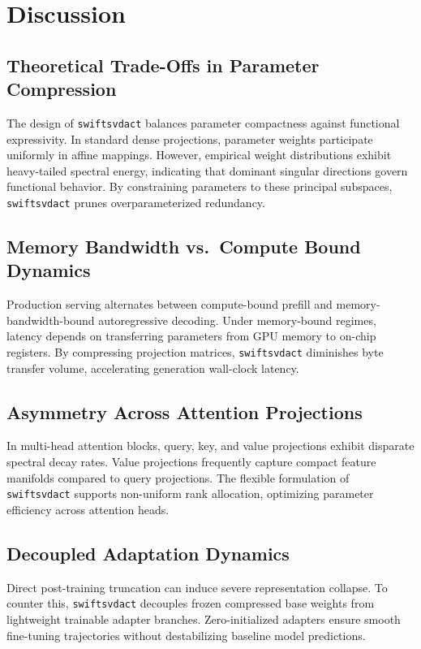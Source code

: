 \section{Discussion}

\subsection{Theoretical Trade-Offs in Parameter Compression}
The design of \texttt{swiftsvdact} balances parameter compactness against functional expressivity. In standard dense projections, parameter weights participate uniformly in affine mappings. However, empirical weight distributions exhibit heavy-tailed spectral energy, indicating that dominant singular directions govern functional behavior. By constraining parameters to these principal subspaces, \texttt{swiftsvdact} prunes overparameterized redundancy.

\subsection{Memory Bandwidth vs.\ Compute Bound Dynamics}
Production serving alternates between compute-bound prefill and memory-bandwidth-bound autoregressive decoding. Under memory-bound regimes, latency depends on transferring parameters from GPU memory to on-chip registers. By compressing projection matrices, \texttt{swiftsvdact} diminishes byte transfer volume, accelerating generation wall-clock latency.

\subsection{Asymmetry Across Attention Projections}
In multi-head attention blocks, query, key, and value projections exhibit disparate spectral decay rates. Value projections frequently capture compact feature manifolds compared to query projections. The flexible formulation of \texttt{swiftsvdact} supports non-uniform rank allocation, optimizing parameter efficiency across attention heads.

\subsection{Decoupled Adaptation Dynamics}
Direct post-training truncation can induce severe representation collapse. To counter this, \texttt{swiftsvdact} decouples frozen compressed base weights from lightweight trainable adapter branches. Zero-initialized adapters ensure smooth fine-tuning trajectories without destabilizing baseline model predictions.

